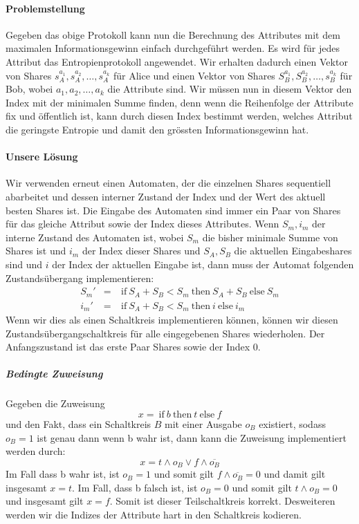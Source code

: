 \documentclass{article}
\begin{document}
\paragraph{Problemstellung}
Gegeben das obige Protokoll kann nun die Berechnung des Attributes
mit dem maximalen Informationsgewinn einfach durchgef\"uhrt werden.
Es wird f\"ur jedes Attribut das Entropienprotokoll angewendet. Wir
erhalten dadurch einen Vektor von Shares 
\(s_A^{a_1}, s_A^{a_2}, \dots, s_A^{a_k}\) f\"ur Alice und einen 
Vektor von Shares \(S_B^{a_1}, S_B^{a_2}, \dots, s_B^{a_k}\) f\"ur
Bob, wobei \(a_1, a_2, \dots, a_k\) die Attribute sind. Wir m\"ussen
nun in diesem Vektor den Index mit der minimalen Summe finden, denn wenn
die Reihenfolge der Attribute fix und \"offentlich ist, kann durch
diesen Index bestimmt werden, welches Attribut die geringste Entropie
und damit den gr\"ossten Informationsgewinn hat.\\
\paragraph{Unsere L\"osung}
Wir verwenden erneut einen Automaten, der die einzelnen Shares 
sequentiell abarbeitet und dessen interner Zustand der Index und der
Wert des aktuell besten Shares ist. Die Eingabe des Automaten sind
immer ein Paar von Shares f\"ur das gleiche Attribut sowie der
Index dieses Attributes. Wenn \(S_m, i_m\) der interne Zustand
des Automaten ist, wobei \(S_m\) die bisher minimale Summe von
Shares ist und \(i_m\) der Index dieser Shares und \(S_A, S_B\)
die aktuellen Eingabeshares sind und \(i\) der Index der aktuellen
Eingabe ist, dann muss der Automat folgenden Zustands\"ubergang
implementieren:
\begin{align*}
S_m' &=& \:\mathrm{if} \: S_A + S_B < S_m \: \mathrm{then} \: S_A + S_B \: \mathrm{else} \: S_m \\
i_m' &=& \: \mathrm{if} \: S_A + S_B < S_m \: \mathrm{then} \: i \: \mathrm{ else } \: i_m
\end{align*}
Wenn wir dies als einen Schaltkreis implementieren k\"onnen, 
k\"onnen wir diesen Zustands\"ubergangschaltkreis f\"ur alle
eingegebenen Shares wiederholen. Der Anfangszustand ist
das erste Paar Shares sowie der Index 0.

\subparagraph{Bedingte Zuweisung}
Gegeben die Zuweisung 
\begin{equation}
x = \: \mathrm{if} \: b \: \mathrm{then} \: t \: \mathrm{else} \: f
\end{equation}
und den Fakt, dass ein Schaltkreis \(B\) mit einer Ausgabe
\(o_B\) existiert, sodass \(o_B = 1\) ist genau dann wenn
b wahr ist, dann kann  die Zuweisung implementiert werden
durch:
\begin{equation}
x = t \wedge o_B \vee f \wedge \overline{o_B}
\end{equation}
Im Fall dass b wahr ist, ist \(o_B = 1\) und somit
gilt \(f \wedge \overline{o_B} = 0\) und damit gilt
insgesamt \(x = t\). Im Fall, dass b falsch ist, ist
\(o_B = 0\) und somit gilt \(t \wedge o_B = 0\) und
insgesamt gilt \(x = f\). Somit ist dieser Teilschaltkreis
korrekt. Desweiteren werden wir die Indizes der Attribute
hart in den Schaltkreis kodieren. 
\end{document}
